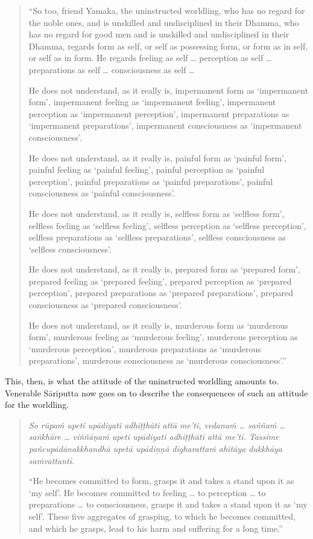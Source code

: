 \begin{quote}
``So too, friend Yamaka, the uninstructed worldling, who has no regard for the noble ones, and is unskilled and undisciplined in their Dhamma, who has no regard for good men and is unskilled and undisciplined in their Dhamma, regards form as self, or self as possessing form, or form as in self, or self as in form. He regards feeling as self \ldots{} perception as self \ldots{} preparations as self \ldots{} consciousness as self \ldots{}

He does not understand, as it really is, impermanent form as `impermanent form', impermanent feeling as `impermanent feeling', impermanent perception as `impermanent perception', impermanent preparations as `impermanent preparations', impermanent consciousness as `impermanent consciousness'.

He does not understand, as it really is, painful form as `painful form', painful feeling as `painful feeling', painful perception as `painful perception', painful preparations as `painful preparations', painful consciousness as `painful consciousness'.

He does not understand, as it really is, selfless form as `selfless form', selfless feeling as `selfless feeling', selfless perception as `selfless perception', selfless preparations as `selfless preparations', selfless consciousness as `selfless consciousness'.

He does not understand, as it really is, prepared form as `prepared form', prepared feeling as `prepared feeling', prepared perception as `prepared perception', prepared preparations as `prepared preparations', prepared consciousness as `prepared consciousness'.

He does not understand, as it really is, murderous form as `murderous form', murderous feeling as `murderous feeling', murderous perception as `murderous perception', murderous preparations as `murderous preparations', murderous consciousness as `murderous consciousness'.''
\end{quote}

This, then, is what the attitude of the uninstructed worldling amounts to. Venerable Sāriputta now goes on to describe the consequences of such an attitude for the worldling.

\begin{quote}
\emph{So rūpaṁ upeti upādiyati adhiṭṭhāti attā me'ti, vedanaṁ \ldots{} saññaṁ \ldots{} saṅkhāre \ldots{} viññāṇaṁ upeti upādiyati adhiṭṭhāti attā me'ti. Tassime pañcupādānakkhandhā upetā upādiṇṇā dīgharattaṁ ahitāya dukkhāya saṁvattanti.}

``He becomes committed to form, grasps it and takes a stand upon it as `my self'. He becomes committed to feeling \ldots{} to perception \ldots{} to preparations \ldots{} to consciousness, grasps it and takes a stand upon it as `my self'. These five aggregates of grasping, to which he becomes committed, and which he grasps, lead to his harm and suffering for a long time.''
\end{quote}

